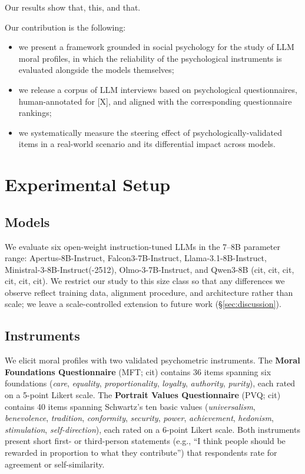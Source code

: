 Our results show that, this, and that.

Our contribution is the following:
\begin{itemize}
    \item we present a framework grounded in social psychology for the study of LLM
    moral profiles, in which the reliability of the psychological instruments is
    evaluated alongside the models themselves;
    \item we release a corpus of LLM interviews based on psychological questionnaires,
    human-annotated for [X], and aligned with the corresponding questionnaire rankings;
    \item we systematically measure the steering effect of psychologically-validated
    items in a real-world scenario and its differential impact across models.
\end{itemize}


\section{Experimental Setup} \label{sec:setup}

\subsection{Models} \label{sec:setup-models}
We evaluate six open-weight instruction-tuned LLMs in the 7--8B parameter range:
Apertus-8B-Instruct, Falcon3-7B-Instruct, Llama-3.1-8B-Instruct,
Ministral-3-8B-Instruct(-2512), Olmo-3-7B-Instruct, and Qwen3-8B (cit, cit, cit, cit,
cit, cit). We restrict our study to this size class so that any differences we observe
reflect training data, alignment procedure, and architecture rather than scale; we
leave a scale-controlled extension to future work (\S\ref{sec:discussion}).

\subsection{Instruments} \label{sec:setup-instruments}
We elicit moral profiles with two validated psychometric instruments. The
\textbf{Moral Foundations Questionnaire} (MFT; cit) contains 36 items spanning six
foundations (\emph{care}, \emph{equality}, \emph{proportionality}, \emph{loyalty},
\emph{authority}, \emph{purity}), each rated on a 5-point Likert scale. The
\textbf{Portrait Values Questionnaire} (PVQ; cit) contains 40 items spanning
Schwartz's ten basic values (\emph{universalism}, \emph{benevolence}, \emph{tradition},
\emph{conformity}, \emph{security}, \emph{power}, \emph{achievement}, \emph{hedonism},
\emph{stimulation}, \emph{self-direction}), each rated on a 6-point Likert scale. Both
instruments present short first- or third-person statements (e.g., ``I think people
should be rewarded in proportion to what they contribute'') that respondents rate for
agreement or self-similarity.

